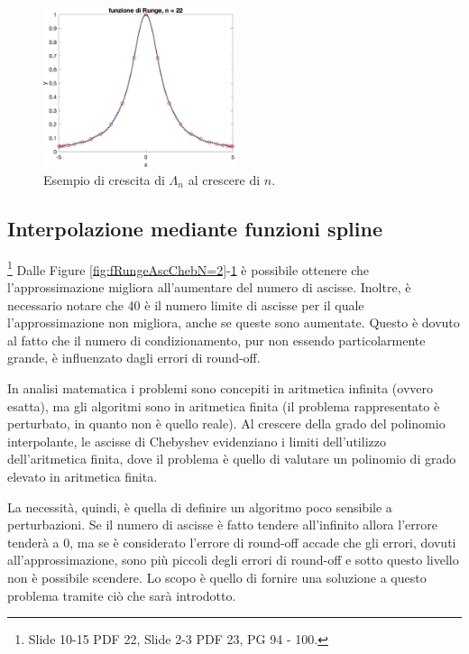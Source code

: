 \begin{figure}
    \centering
    \includegraphics[width=0.5\textwidth]{immagini/fRungeAscChebN=22.jpg}
    \caption{Esempio di crescita di $\Lambda_n$ al crescere di $n$.}\label{fig:fRungeAscChebN=22}
\end{figure}

\subsection{Interpolazione mediante funzioni spline} \footnote{Slide 10-15 PDF 22, Slide 2-3 PDF 23, PG 94 - 100.}
Dalle Figure \ref{fig:fRungeAscChebN=2}-\ref{fig:fRungeAscChebN=22} è possibile ottenere che l'approssimazione migliora all'aumentare del numero di ascisse. Inoltre, è necessario notare che 40 è il numero limite di ascisse per il quale l'approssimazione non migliora, anche se queste sono aumentate. Questo è dovuto al fatto che il numero di condizionamento, pur non essendo particolarmente grande, è influenzato dagli errori di round-off.

In analisi matematica i problemi sono concepiti in aritmetica infinita (ovvero esatta),  ma gli algoritmi sono in aritmetica finita (il problema rappresentato è perturbato, in quanto non è quello reale). Al crescere della grado del polinomio interpolante, le ascisse di Chebyshev evidenziano i limiti dell'utilizzo dell'aritmetica finita, dove il problema è quello di valutare un polinomio di grado elevato in aritmetica finita.

La necessità, quindi, è quella di definire un algoritmo poco sensibile a perturbazioni. Se il numero di ascisse è fatto tendere all'infinito allora l'errore tenderà a 0, ma se è considerato l'errore di round-off accade che gli errori, dovuti all'approssimazione, sono più piccoli degli errori di round-off e sotto questo livello non è possibile scendere. Lo scopo è quello di fornire una soluzione a questo problema tramite ciò che sarà introdotto.

